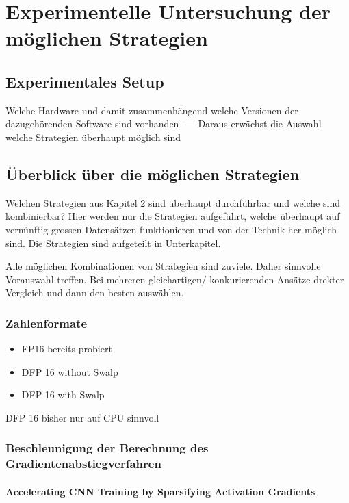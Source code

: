 \chapter{Experimentelle Untersuchung der möglichen Strategien}





\section{Experimentales Setup}

Welche Hardware und damit zusammenhängend welche Versionen der dazugehörenden Software sind vorhanden ---- Daraus erwächst die Auswahl welche Strategien überhaupt möglich sind 


\section{Überblick über die möglichen Strategien}

Welchen Strategien aus Kapitel 2 sind überhaupt durchführbar und welche sind kombinierbar?
Hier werden nur die Strategien aufgeführt, welche überhaupt auf vernünftig grossen Datensätzen funktionieren und von der Technik her möglich sind.
Die Strategien sind aufgeteilt in Unterkapitel. 

Alle möglichen Kombinationen von Strategien sind zuviele. Daher sinnvolle Vorauswahl treffen.  
Bei mehreren gleichartigen/ konkurierenden Ansätze drekter Vergleich und dann den besten auswählen.
\subsection{Zahlenformate}

\begin{itemize}
 \item FP16 bereits probiert
 \item DFP 16 without Swalp
 \item DFP 16 with Swalp
\end{itemize}

DFP 16 bisher nur auf CPU sinnvoll

\subsection{Beschleunigung der Berechnung des Gradientenabstiegverfahren}


\subsubsection{Accelerating CNN Training by Sparsifying Activation Gradients}

